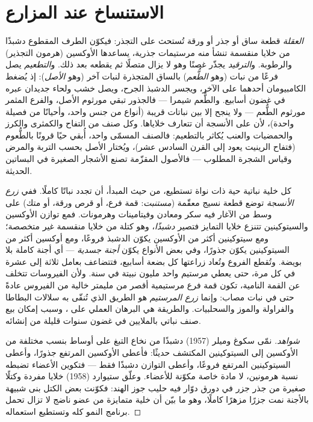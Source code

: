 \section{الاستنساخ عند المزارع}

\begin{proposition}\label{prop:b2:asexual-reproduction:horticulture}
\emph{العقلة} قطعة ساق أو جذر أو ورقة تُستحث على التجذر:
فيكوّن الطرف المقطوع دشبذًا من خلايا منقسمة تنشأ منه مرستيمات
جذرية، يساعدها الأوكسين (هرمون التجذير) والرطوبة.
و\emph{الترقيد} يجذّر غصنًا وهو لا يزال متصلًا ثم يقطعه
بعد ذلك. و\emph{التطعيم} يصل فرعًا من نبات (وهو
\emph{الطُّعم}) بالساق المتجذرة لنبات آخر (وهو \emph{الأصل}):
إذ يُضغط الكامبيومان أحدهما على الآخر، ويجسر الدشبذ الجرح، ويصل
خشب ولحاء جديدان عبره في غضون أسابيع. والطُّعم شيمرا
--- فالجذور تبقي مورثوم الأصل، والفرع المثمر مورثوم
الطُّعم --- ولا ينجح إلا بين نباتات قريبة (أنواع من جنس واحد،
وأحيانًا من فصيلة واحدة)، لأن على الأنسجة أن تتعارف
خلاياها. وكل صنف من التفاح والكمثرى والكرز والحمضيات
والعنب يُكاثر بالتطعيم: فالصنف المسمّى  واحد،
أُبقي حيًا قرونًا بالطُّعوم (فتفاح الرينيت يعود
إلى القرن السادس عشر)، ويُختار الأصل بحسب
التربة والمرض وقياس الشجرة المطلوب --- فالأصول
المقزّمة تصنع الأشجار الصغيرة في البساتين الحديثة.
\end{proposition}

\begin{proposition}\label{prop:b2:asexual-reproduction:tissueculture}
كل خلية نباتية حية ذات نواة تستطيع، من حيث المبدأ، أن تجدد نباتًا
كاملًا. ففي \emph{زرع الأنسجة} توضع قطعة نسيج معقّمة
(\emph{مستنبت}: قمة فرع، أو قرص ورقة، أو متك) على وسط
من الآغار فيه سكر ومعادن وفيتامينات وهرمونات. فمع توازن
الأوكسين والسيتوكينين تتنزع خلايا التمايز فتصير
\emph{دشبذًا}، وهو كتلة من خلايا منقسمة غير متخصصة؛ ومع
سيتوكينين أكثر من الأوكسين يكوّن الدشبذ فروعًا، ومع أوكسين أكثر من
السيتوكينين يكوّن جذورًا، وفي بعض الأنواع يكوّن \emph{أجنة
جسدية} --- أي أجنة كاملة بلا بويضة. وتُقطع الفروع
وتُعاد زراعتها كل بضعة أسابيع، فتتضاعف بعامل ثلاثة إلى
عشرة في كل مرة، حتى يعطي مرستيم واحد مليون نبيتة في
سنة. ولأن الفيروسات تتخلف عن القمة النامية، تكون قمة فرع
مرستيمية أقصر من مليمتر خالية من الفيروس عادةً حتى في نبات
مصاب: وإنما \emph{زرع المرستيم} هو الطريق الذي تُنقّى به
سلالات البطاطا والفراولة والموز والسحلبيات. والطريقة هي
البرهان العملي على ، وسبب إمكان بيع صنف نباتي
بالملايين في غضون سنوات قليلة من إنشائه.
\end{proposition}
\begin{proof}[شواهد]
نمّى سكوغ وميلر (1957) دشبذًا من نخاع التبغ على أوساط بنسب مختلفة
من الأوكسين إلى السيتوكينين المكتشف حديثًا: فأعطى الأوكسين المرتفع
جذورًا، وأعطى السيتوكينين المرتفع فروعًا، وأعطى التوازن دشبذًا
فقط --- فتكوين الأعضاء تضبطه نسبة هرمونين، لا مادة
خاصة مكوّنة للأعضاء. وعلّق ستيوارد (1958) خلايا مفردة وكتلًا صغيرة
من جذر جزر في دورق دوّار فيه حليب جوز الهند: فكوّنت بعض الكتل بنى
شبيهة بالأجنة نمت جزرًا مزهرًا كاملًا، وهو ما بيّن أن خلية متمايزة
من عضو ناضج لا تزال تحمل برنامج النمو كله وتستطيع استعماله.
\end{proof}

